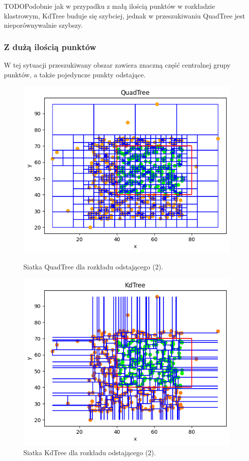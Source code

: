 \documentclass{lab}
\begin{document}
TODOPodobnie jak w przypadku z małą ilością punktów w rozkładzie klastrowym, KdTree buduje się szybciej, jednak w przeszukiwaniu QuadTree jest nieporównywalnie szybszy.

\newpage
\subsubsection{Z dużą ilością punktów}
W tej sytuacji przeszukiwany obszar zawiera znaczną część centralnej grupy punktów, a także pojedyncze punkty odstające.

\begin{figure}[H]
  \centering
  \begin{minipage}{0.495\textwidth}
      \centering
      \includegraphics[width=1\textwidth]{resources/outlier_QuadTree_2.png}
      \caption{Siatka QuadTree dla rozkładu odstającego (2).}
      \label{fig:outlier_QuadTree_2}
  \end{minipage}
  \begin{minipage}{0.495\textwidth}
      \centering
      \includegraphics[width=1\textwidth]{resources/outlier_KdTree_2.png}
      \caption{Siatka KdTree dla rozkładu odstającego (2).}
      \label{fig:outlier_KdTree_2}
  \end{minipage}
\end{figure}
\end{document}

